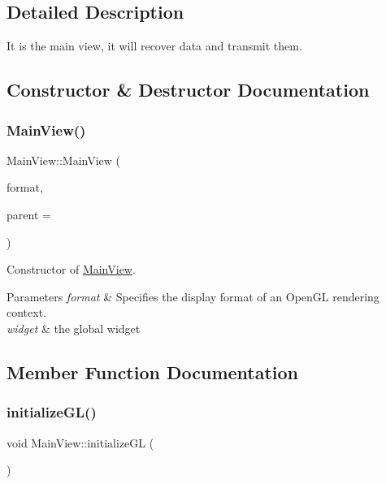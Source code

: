 \subsection{Detailed Description}
It is the main view, it will recover data and transmit them. 

\subsection{Constructor \& Destructor Documentation}
\hypertarget{class_main_view_a46ff460541fd6b9dfe75eeff6b78466a}{}\label{class_main_view_a46ff460541fd6b9dfe75eeff6b78466a} 
\subsubsection{\texorpdfstring{Main\+View()}{MainView()}}
{\footnotesize\ttfamily Main\+View\+::\+Main\+View (\begin{DoxyParamCaption}\item[{const Q\+G\+L\+Format \&}]{format,  }\item[{Q\+Widget $\ast$}]{parent = {} }\end{DoxyParamCaption})}



Constructor of \hyperlink{class_main_view}{Main\+View}. 


\begin{DoxyParams}{Parameters}
{\em format} & Specifies the display format of an Open\+GL rendering context. \\
\hline
{\em widget} & the global widget \\
\hline
\end{DoxyParams}


\subsection{Member Function Documentation}
\hypertarget{class_main_view_aba66808352339bdf5f459d134181e4b0}{}\label{class_main_view_aba66808352339bdf5f459d134181e4b0} 
\subsubsection{\texorpdfstring{initialize\+G\+L()}{initializeGL()}}
{\footnotesize\ttfamily void Main\+View\+::initialize\+GL (\begin{DoxyParamCaption}{ }\end{DoxyParamCaption})\hspace{0.3cm}{\ttfamily [protected]}}


